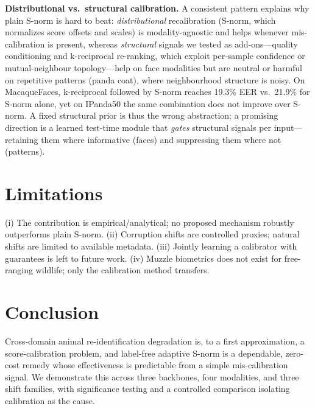 \documentclass[conference]{IEEEtran}
\begin{document}
\textbf{Distributional vs.\ structural calibration.} A consistent pattern explains why plain S-norm
is hard to beat: \emph{distributional} recalibration (S-norm, which normalizes score offsets and
scales) is modality-agnostic and helps whenever mis-calibration is present, whereas \emph{structural}
signals we tested as add-ons---quality conditioning and k-reciprocal re-ranking, which exploit
per-sample confidence or mutual-neighbour topology---help on face modalities but are neutral or
harmful on repetitive patterns (panda coat), where neighbourhood structure is noisy. On MacaqueFaces,
k-reciprocal followed by S-norm reaches 19.3\% EER vs.\ 21.9\% for S-norm alone, yet on IPanda50 the
same combination does not improve over S-norm. A fixed structural prior is thus the wrong
abstraction; a promising direction is a learned test-time module that \emph{gates} structural signals
per input---retaining them where informative (faces) and suppressing them where not (patterns).

\section{Limitations}
(i) The contribution is empirical/analytical; no proposed mechanism robustly outperforms plain
S-norm. (ii) Corruption shifts are controlled proxies; natural shifts are limited to available
metadata. (iii) Jointly learning a calibrator with guarantees is left to future work. (iv) Muzzle
biometrics does not exist for free-ranging wildlife; only the calibration method transfers.

\section{Conclusion}
Cross-domain animal re-identification degradation is, to a first approximation, a score-calibration
problem, and label-free adaptive S-norm is a dependable, zero-cost remedy whose effectiveness is
predictable from a simple mis-calibration signal. We demonstrate this across three backbones, four
modalities, and three shift families, with significance testing and a controlled comparison isolating
calibration as the cause.
\end{document}
